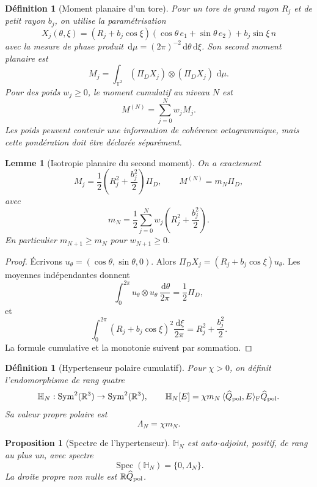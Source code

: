 \documentclass[11pt,a4paper]{article}
\newtheorem{proposition}[theorem]{Proposition}
\newtheorem{lemma}[theorem]{Lemme}
\newtheorem{definition}[theorem]{Définition}
\newcommand{\R}{\mathbb R}
\newcommand{\T}{\mathbb T}
\newcommand{\dd}{\,\mathrm d}
\begin{document}
\begin{definition}[Moment planaire d'un tore]
Pour un tore de grand rayon $R_j$ et de petit rayon $b_j$, on utilise la paramétrisation
\[
 X_j(\theta,\xi)=
 (R_j+b_j\cos\xi)(\cos\theta\,e_1+\sin\theta\,e_2)
 +b_j\sin\xi\,n
\]
avec la mesure de phase produit $\dd\mu=(2\pi)^{-2}\dd\theta\dd\xi$. Son second moment planaire est
\[
 M_j=\int_{\T^2}(\Pi_DX_j)\otimes(\Pi_DX_j)\,\dd\mu.
\]
Pour des poids $w_j\ge0$, le moment cumulatif au niveau $N$ est
\[
 M^{(N)}=\sum_{j=0}^{N}w_jM_j.
\]
Les poids peuvent contenir une information de cohérence octagrammique, mais cette pondération doit être déclarée séparément.
\end{definition}

\begin{lemma}[Isotropie planaire du second moment]\label{lem:torusmoment}
On a exactement
\begin{equation}\label{eq:torusmoment}
 M_j=\frac12\left(R_j^2+\frac{b_j^2}{2}\right)\Pi_D,
 \qquad
 M^{(N)}=m_N\Pi_D,
\end{equation}
avec
\[
 m_N=\frac12\sum_{j=0}^{N}w_j\left(R_j^2+\frac{b_j^2}{2}\right).
\]
En particulier $m_{N+1}\ge m_N$ pour $w_{N+1}\ge0$.
\end{lemma}

\begin{proof}
Écrivons $u_\theta=(\cos\theta,\sin\theta,0)$. Alors
$\Pi_DX_j=(R_j+b_j\cos\xi)u_\theta$. Les moyennes indépendantes donnent
\[
 \int_0^{2\pi}u_\theta\otimes u_\theta\,\frac{\dd\theta}{2\pi}
 =\frac12\Pi_D,
\]
et
\[
 \int_0^{2\pi}(R_j+b_j\cos\xi)^2\frac{\dd\xi}{2\pi}
 =R_j^2+\frac{b_j^2}{2}.
\]
La formule cumulative et la monotonie suivent par sommation.
\end{proof}

\begin{definition}[Hypertenseur polaire cumulatif]\label{def:Hpol}
Pour $\chi>0$, on définit l'endomorphisme de rang quatre
\begin{equation}\label{eq:Hpol}
 \mathbb H_N:\operatorname{Sym}^2(\R^3)\to\operatorname{Sym}^2(\R^3),
 \qquad
 \mathbb H_N[E]
 =\chi m_N\,\langle\widehat Q_{\rm pol},E\rangle_{\rm F}\widehat Q_{\rm pol}.
\end{equation}
Sa valeur propre polaire est
\[
 \Lambda_N=\chi m_N.
\]
\end{definition}

\begin{proposition}[Spectre de l'hypertenseur]
$\mathbb H_N$ est auto-adjoint, positif, de rang au plus un, avec spectre
\[
 \operatorname{Spec}(\mathbb H_N)=\{0,\Lambda_N\}.
\]
La droite propre non nulle est $\R\widehat Q_{\rm pol}$.
\end{proposition}
\end{document}
